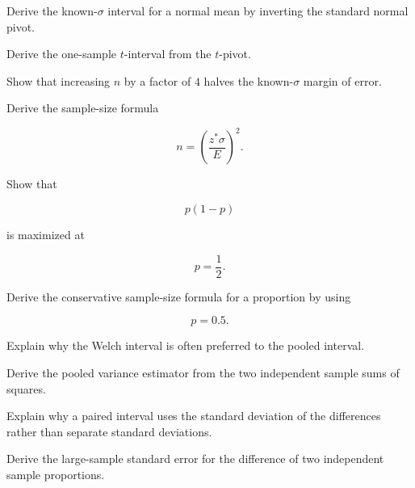\begin{exercise}[3]
Derive the known-\(\sigma\) interval for a normal mean by inverting the
standard normal pivot.
\end{exercise}

\begin{exercise}[3]
Derive the one-sample \(t\)-interval from the \(t\)-pivot.
\end{exercise}

\begin{exercise}[3]
Show that increasing \(n\) by a factor of \(4\) halves the known-\(\sigma\)
margin of error.
\end{exercise}

\begin{exercise}[3]
Derive the sample-size formula

\[
n
=
\left(
\frac{
z^*\sigma
}{E}
\right)^2.
\]
\end{exercise}

\begin{exercise}[3]
Show that

\[
p(1-p)
\]

is maximized at

\[
p=\frac12.
\]
\end{exercise}

\begin{exercise}[3]
Derive the conservative sample-size formula for a proportion by using

\[
p=0.5.
\]
\end{exercise}

\begin{exercise}[3]
Explain why the Welch interval is often preferred to the pooled interval.
\end{exercise}

\begin{exercise}[3]
Derive the pooled variance estimator from the two independent sample sums
of squares.
\end{exercise}

\begin{exercise}[3]
Explain why a paired interval uses the standard deviation of the
differences rather than separate standard deviations.
\end{exercise}

\begin{exercise}[3]
Derive the large-sample standard error for the difference of two
independent sample proportions.
\end{exercise}

